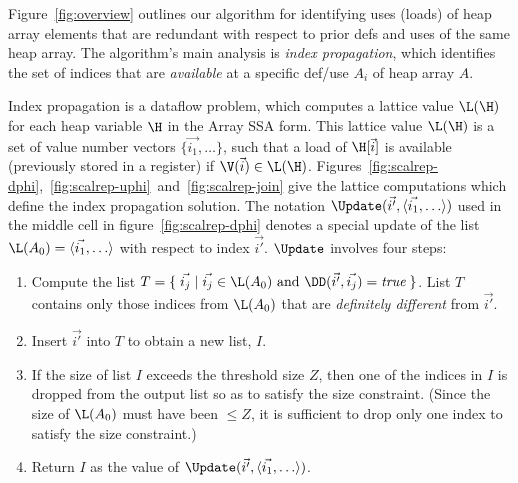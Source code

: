 Figure~\ref{fig:overview} outlines our algorithm for identifying
uses (loads) of 
heap array elements that are redundant with respect to prior 
defs and uses of the same heap array.
The algorithm's main analysis is {\it index propagation},
which identifies the set of indices that
are {\em available} at a specific def/use  $A_i$ of heap array $A$.

Index propagation is a dataflow problem, which computes a lattice value
$\L(\H)$ for each heap variable $\H$ in the Array SSA form.  This
lattice value $\L(\H)$ is a set of value number vectors $\{\vec{i_1},\ldots \}$, such that a load of $\H[\vec{i}]$ is available (previously stored in a register)
if $\V(\vec{i}) \in \L(\H)$.
Figures~\ref{fig:scalrep-dphi},~\ref{fig:scalrep-uphi}~and~\ref{fig:scalrep-join} give the lattice computations which define the index propagation solution.
The notation 
$\Update(\vec{i'},\langle \vec{i_1}, \ldots \rangle)$
used in the middle cell in 
figure~\ref{fig:scalrep-dphi} denotes a special update of 
the list $\L(A_0) = \langle \vec{i_1}, \ldots \rangle$
with respect to index $\vec{i'}$.
$\Update$ involves four steps:
\begin{enumerate}
\item Compute the list $T = \{\;\vec{i_j}\;|\;\vec{i_j}\in\L(A_0)
\mbox{~and~}\DD(\vec{i'},\vec{i_j})=\mbox{\it true}\;\}$.  List $T$
contains only those indices from $\L(A_0)$ that are
{\it definitely different} from $\vec{i'}$.

\item Insert $\vec{i'}$ into $T$ to obtain a new list, $I$.
\item If the 
size of list
$I$ exceeds the threshold size $Z$, then one of the indices in $I$ is
dropped from the output list so as to satisfy the size constraint.  
(Since the size of $\L(A_0)$ must have been $\leq Z$, it is sufficient
to drop only one index to satisfy the size constraint.)
\item Return $I$ as the value of 
$\Update(\vec{i'},\langle \vec{i_1}, \ldots \rangle)$.
\end{enumerate}


